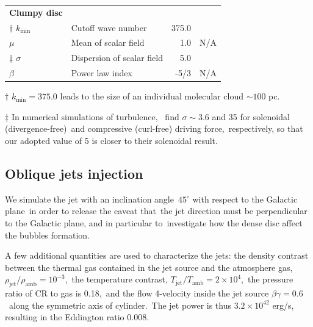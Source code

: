 \documentclass[fleqn,usenatbib,useAMS]{mnras}
\begin{document}
\begin{table}
\begin{tabular}{@{}llrc@{}}
{\bf Clumpy disc }                    &                                &                                      &                                \\
$\dagger$  $k_{\text{min}}$           & Cutoff wave number             & 375.0                                & \citep{peak-ism-density}       \\
$\mu$                                 & Mean of scalar field           & 1.0                                  &   N/A                          \\
$\ddag$  $\sigma$                     & Dispersion of scalar field     & 5.0                                  & \citep{Federrath2010}          \\
$\beta$                               & Power law index                & -5/3                                 &   N/A                          \\ \midrule
\end{tabular}
\begin{tablenotes}
      \raggedright
      \item  $\dagger$  $k_{\text{min}}=375.0$ leads to the size of an individual molecular cloud $\sim 100$ pc.
      \item  $\ddag$ In numerical simulations of turbulence,\
             \citet{Federrath2010} find $\sigma\sim 3.6$ and 35 for solenoidal (divergence-free)\
             and compressive (curl-free) driving force,\
             respectively, so that our adopted value of 5 is closer to their solenoidal result.
    \end{tablenotes}
\end{table}

%

\subsection{Oblique jets injection}

  We simulate the jet with an inclination angle\
  $45^{\circ}$ with respect to the Galactic plane\
  in order to release the caveat that\
  the jet direction must be perpendicular to the Galactic plane, and in particular to\
  investigate how the dense disc affect the bubbles formation.


  A few additional quantities are used to characterize the jets:
  the density contrast between the thermal gas contained in the jet source and the atmosphere gas,\
  $\rho_{\text{jet}}/\rho_{\text{amb}}=10^{-3}$,\
  the temperature contrast, $T_{\text{jet}}/T_{\text{amb}}=2\times10^{4}$,\
  the pressure ratio of CR to gas is 0.18,\
  and the flow 4-velocity inside the jet source $\beta\gamma = 0.6$\
  along the symmetric axis of cylinder.\
  The jet power is thus $3.2\times 10^{42}$ erg/s, resulting in the Eddington ratio 0.008.
\end{document}
